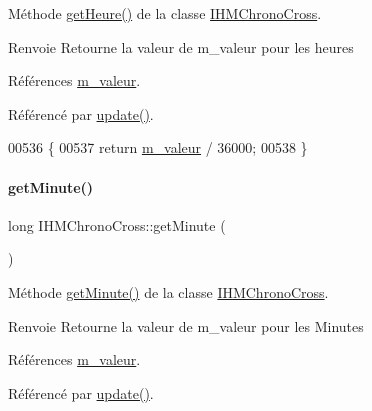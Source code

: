 Méthode \hyperlink{class_i_h_m_chrono_cross_a42054b4d5246c939bf0f621edb0e1aae}{get\+Heure()} de la classe \hyperlink{class_i_h_m_chrono_cross}{I\+H\+M\+Chrono\+Cross}. 

\begin{DoxyReturn}{Renvoie}
Retourne la valeur de m\+\_\+valeur pour les heures 
\end{DoxyReturn}


Références \hyperlink{class_i_h_m_chrono_cross_a4bb2449f0b2cc9891c09fa3e32f56229}{m\+\_\+valeur}.



Référencé par \hyperlink{class_i_h_m_chrono_cross_a2cc8b686168528ab0d642a0cba6e1c5a}{update()}.


\begin{DoxyCode}
00536 \{
00537     \textcolor{keywordflow}{return} \hyperlink{class_i_h_m_chrono_cross_a4bb2449f0b2cc9891c09fa3e32f56229}{m\_valeur} / 36000;
00538 \}
\end{DoxyCode}
\mbox{\label{class_i_h_m_chrono_cross_a0cee9742e561398390bedb29ef7d6258}} 
\paragraph{\texorpdfstring{get\+Minute()}{getMinute()}}
{\footnotesize\ttfamily long I\+H\+M\+Chrono\+Cross\+::get\+Minute (\begin{DoxyParamCaption}{ }\end{DoxyParamCaption})\hspace{0.3cm}{\ttfamily [private]}}



Méthode \hyperlink{class_i_h_m_chrono_cross_a0cee9742e561398390bedb29ef7d6258}{get\+Minute()} de la classe \hyperlink{class_i_h_m_chrono_cross}{I\+H\+M\+Chrono\+Cross}. 

\begin{DoxyReturn}{Renvoie}
Retourne la valeur de m\+\_\+valeur pour les Minutes 
\end{DoxyReturn}


Références \hyperlink{class_i_h_m_chrono_cross_a4bb2449f0b2cc9891c09fa3e32f56229}{m\+\_\+valeur}.



Référencé par \hyperlink{class_i_h_m_chrono_cross_a2cc8b686168528ab0d642a0cba6e1c5a}{update()}.


